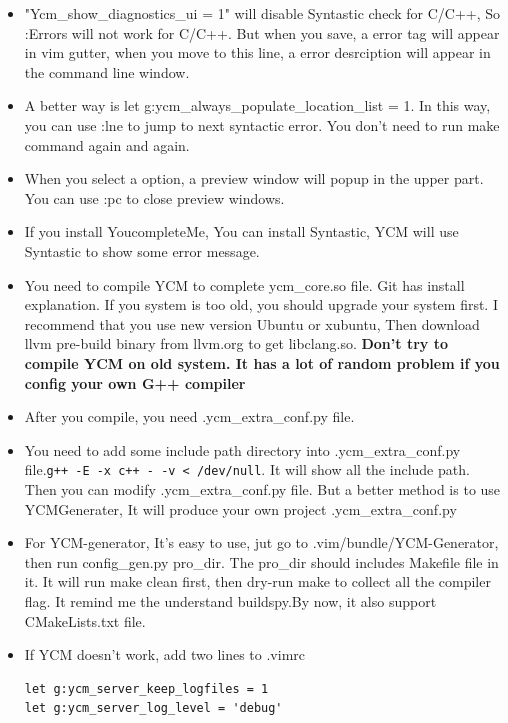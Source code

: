 \documentclass[a4paper,12pt,twoside]{book}
\begin{document}
\begin{itemize}
\item "Ycm\_show\_diagnostics\_ui = 1" will disable Syntastic check for C/C++, So :Errors will not work for C/C++. But when you save, a error tag will appear in vim gutter, when you move to this line, a error desrciption will appear in the command line window. 

		\item A better way is let g:ycm\_always\_populate\_location\_list = 1. In this way, you can use :lne to jump to next syntactic error. You don't need to run make command again and again.
				

\item When you select a option, a preview window will popup in the upper part. You can use :pc to close preview windows.

\item If you install YoucompleteMe, You can install Syntastic, YCM will use Syntastic to show some error message.   

\item You need to compile YCM to complete ycm\_core.so file. Git has install explanation. If you system is too old, you should upgrade your system first. I recommend that you use new version Ubuntu or xubuntu, Then download llvm pre-build binary from llvm.org to get libclang.so. \textbf{Don't try to compile YCM on old system. It has a lot of random problem if you config your own G++ compiler}

\item After you compile, you need .ycm\_extra\_conf.py file. 

\item You need to add some include path directory into .ycm\_extra\_conf.py file.\verb=g++ -E -x c++ - -v < /dev/null=. It will show all the include path. Then you can modify .ycm\_extra\_conf.py file. But a better method is to use YCMGenerater, It will produce your own project .ycm\_extra\_conf.py

\item For YCM-generator, It's easy to use, jut go to .vim/bundle/YCM-Generator, then run config\_gen.py pro\_dir. The pro\_dir should includes Makefile file in it.  It will run make clean first, then dry-run make to collect all the compiler flag. It remind me the understand buildspy.By now, it also support CMakeLists.txt file. 

\item If YCM doesn't work, add two lines to .vimrc 
\begin{verbatim}
let g:ycm_server_keep_logfiles = 1
let g:ycm_server_log_level = 'debug'
\end{verbatim}


\end{itemize}
\end{document}
